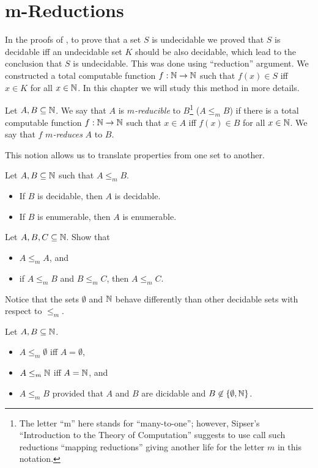 \chapter{m-Reductions}
In the proofs of , to prove
that a set $S$ is undecidable we proved that $S$ is decidable iff an undecidable
set $K$ should be also decidable, which lead to the conclusion that $S$ is
undecidable. This was done using ``reduction'' argument. We constructed a total
computable function $f : {\mathbb{N}} \to {\mathbb{N}}$ such that $f(x) \in S$ iff $x \in K$ for all
$x \in {\mathbb{N}}$. In
this chapter we will study this method in more details.

\begin{definition}
  Let $A, B \subseteq {\mathbb{N}}$. We say that $A$ is \emph{$m$-reducible} to
  $B$\footnote{%
    The letter ``m'' here stands for ``many-to-one''; however, Sipser's
    ``Introduction to the Theory of Computation'' suggests to use call such
    reductions ``mapping reductions'' giving another life for the letter $m$ in
    this notation.
  }
  ($A \le_m B$) if there is a total computable function $f : {\mathbb{N}} \to {\mathbb{N}}$ such
  that $x \in A$ iff $f(x) \in B$ for all $x \in {\mathbb{N}}$. We say that $f$
  \emph{$m$-reduces} $A$ to $B$.
\end{definition}

This notion allows us to translate properties from one set to another.
\begin{theorem}
  Let $A, B \subseteq {\mathbb{N}}$ such that $A \le_m B$.
  \begin{itemize}
    \item If $B$ is decidable, then $A$ is decidable.
    \item If $B$ is enumerable, then $A$ is enumerable.
  \end{itemize}
\end{theorem}

\begin{exercise}
  Let $A, B, C \subseteq {\mathbb{N}}$. Show that
  \begin{itemize}
    \item $A \le_m A$, and 
    \item if $A \le_m B$ and $B \le_m C$, then $A \le_m C$.
  \end{itemize}
\end{exercise}

Notice that the sets $\emptyset$ and ${\mathbb{N}}$ behave differently than other
decidable sets with respect to $\le_m$.
\begin{remark}
  Let $A, B \subseteq {\mathbb{N}}$.
  \begin{itemize}
    \item $A \le_m \emptyset$ iff $A = \emptyset$, 
    \item $A \le_m {\mathbb{N}}$ iff $A = {\mathbb{N}}$, and
    \item $A \le_m B$ provided that $A$ and $B$ are dicidable and $B \not\in
      \set{\emptyset, \N}$.
  \end{itemize}
\end{remark}

